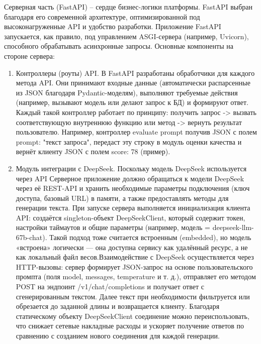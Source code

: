 Серверная часть (FastAPI) – сердце бизнес-логики платформы. FastAPI выбран благодаря его современной архитектуре, оптимизированной под высоконагруженные API и удобство разработки. Приложение FastAPI запускается, как правило, под управлением ASGI-сервера (например, Uvicorn), способного обрабатывать асинхронные запросы. Основные компоненты на стороне сервера:
\begin{enumerate}[label=\arabic*]
    \item Контроллеры (роуты) API. В FastAPI разработаны обработчики для каждого метода API. Они принимают входные данные (автоматически распарсенные из JSON благодаря Pydantic-моделям), выполняют требуемые действия (например, вызывают модель или делают запрос к БД) и формируют ответ. Каждый такой контроллер работает по принципу: получить запрос -> вызвать соответствующую внутреннюю функцию или метод -> вернуть результат пользователю. Например, контроллер evaluate prompt получив JSON с полем prompt: "текст запроса", передаст эту строку в модуль оценки качества и вернёт клиенту JSON с полем score: 78 (пример).
    \item Модуль интеграции с DeepSeek. Поскольку модель DeepSeek используется через API Серверное приложение должно обращаться к модели DeepSeek через её REST-API и хранить необходимые параметры подключения (ключ доступа, базовый URL) в памяти, а также предоставлять методы для генерации текста. При запуске сервера выполняется инициализация клиента API: создаётся singleton-объект DeepSeekClient, который содержит токен, настройки таймаутов и общие параметры (например, модель = deepseek-llm-67b-chat). Такой подход тоже считается встроенным (embedded), но модель «встроена» логически — она доступна сервису как удалённый ресурс, а не как локальный файл весов\cite{deepseek:docs}.Взаимодействие с DeepSeek осуществляется через HTTP-вызовы: сервер формирует JSON-запрос на основе пользовательского промпта (поля model, messages, temperature и т. д.), отправляет его методом POST на эндпоинт /v1/chat/completions и получает ответ с сгенерированным текстом. Далее текст при необходимости фильтруется или обрезается до заданной длины и возвращается клиенту. Благодаря статическому объекту DeepSeekClient соединение можно переиспользовать, что снижает сетевые накладные расходы и ускоряет получение ответов по сравнению с созданием нового соединения для каждой генерации.

\end{enumerate}
